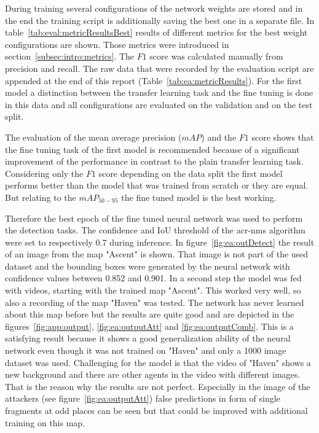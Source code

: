 During training several configurations of the network weights are stored and in the end the training 
script is additionally saving the best one in a separate file. In table~\ref{tab:eval:metricResultsBest} 
results of different metrics for the best weight configurations are shown. Those metrics were 
introduced in section~\ref{subsec:intro:metrics}. The $F1$ score was calculated manually from 
precision and recall. The raw data that were recorded by the evaluation script are appended at the 
end of this report (Table~\ref{tab:ea:metricResults}). For the first model a distinction between the 
transfer learning task and the fine tuning is done in this data and all configurations are evaluated on 
the validation and on the test split. 

The evaluation of the mean average precision ($mAP$) and the $F1$ score shows that the fine 
tuning task of the first model is recommended because of a significant improvement of the 
performance in contrast to the plain transfer learning task. Considering only the $F1$ score 
depending on the data split the first model performs better than the model that was trained from 
scratch or they are equal. But relating to the $mAP_{50-95}$ the fine tuned model is the best 
working.

Therefore the best epoch of the fine tuned neural network was used to perform the detection tasks. 
The confidence and IoU threshold of the \gls{acr-nms} algorithm were set to respectively 0.7 during 
inference. In figure~\ref{fig:ea:outDetect} the result of an image from the map "Ascent" is shown. 
That image is not part of the used dataset and the bounding boxes were generated by the neural 
network with confidence values between 0.852 and 0.901. In a second step the model was fed with 
videos, starting with the trained map "Ascent". This worked very well, so also a recording of the map 
"Haven" was tested. The network has never learned about this map before but the results 
are quite good and are depicted in the figures~\ref{fig:app:output}, \ref{fig:ea:outputAtt} and 
\ref{fig:ea:outputComb}. This is a satisfying result because it shows a good generalization ability of 
the neural network even though it was not trained on "Haven" and only a 1000 image dataset was 
used. Challenging for the model is that the video of "Haven" shows a new background and there are 
other agents in the video with different images. That is the reason why the results are not perfect. 
Especially in the image of the attackers (see figure~\ref{fig:ea:outputAtt}) false predictions in form of 
single fragments at odd places can be seen but that could be improved with additional training on 
this map.
